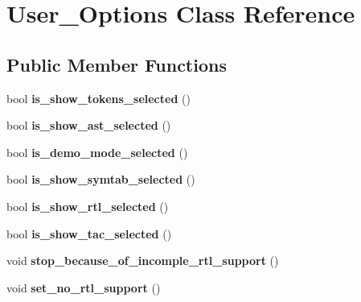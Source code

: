 \hypertarget{classUser__Options}{}\section{User\+\_\+\+Options Class Reference}
\label{classUser__Options}
\subsection*{Public Member Functions}
\begin{DoxyCompactItemize}
\item 
\mbox{\label{classUser__Options_accbe601f7c1da8c5f416b2a9c1ca5670}} 
bool {\bfseries is\+\_\+show\+\_\+tokens\+\_\+selected} ()
\item 
\mbox{\label{classUser__Options_ae9f3a1c8c60a937ad35fbd83f1e120d2}} 
bool {\bfseries is\+\_\+show\+\_\+ast\+\_\+selected} ()
\item 
\mbox{\label{classUser__Options_a2dc0eaef26d6c3529cc9ed92de58df99}} 
bool {\bfseries is\+\_\+demo\+\_\+mode\+\_\+selected} ()
\item 
\mbox{\label{classUser__Options_a867f9d3a79a3613fbd113587d27fb460}} 
bool {\bfseries is\+\_\+show\+\_\+symtab\+\_\+selected} ()
\item 
\mbox{\label{classUser__Options_a3e11f8dbbf4c1b291805b79af337e359}} 
bool {\bfseries is\+\_\+show\+\_\+rtl\+\_\+selected} ()
\item 
\mbox{\label{classUser__Options_a1c07634be3ce69c7971ba6fb2dafd48a}} 
bool {\bfseries is\+\_\+show\+\_\+tac\+\_\+selected} ()
\item 
\mbox{\label{classUser__Options_ad8eaf76e13ba102adf5d018fa091c725}} 
void {\bfseries stop\+\_\+because\+\_\+of\+\_\+incomple\+\_\+rtl\+\_\+support} ()
\item 
\mbox{\label{classUser__Options_ad4c8fc5cf4c0a98d08b43e41f190a0ad}} 
void {\bfseries set\+\_\+no\+\_\+rtl\+\_\+support} ()
\item 
\mbox{\label{classUser__Options_a7ebc370b9c740e2e9d6c0b058a0a6d95}} 

\end{DoxyCompactItemize}
